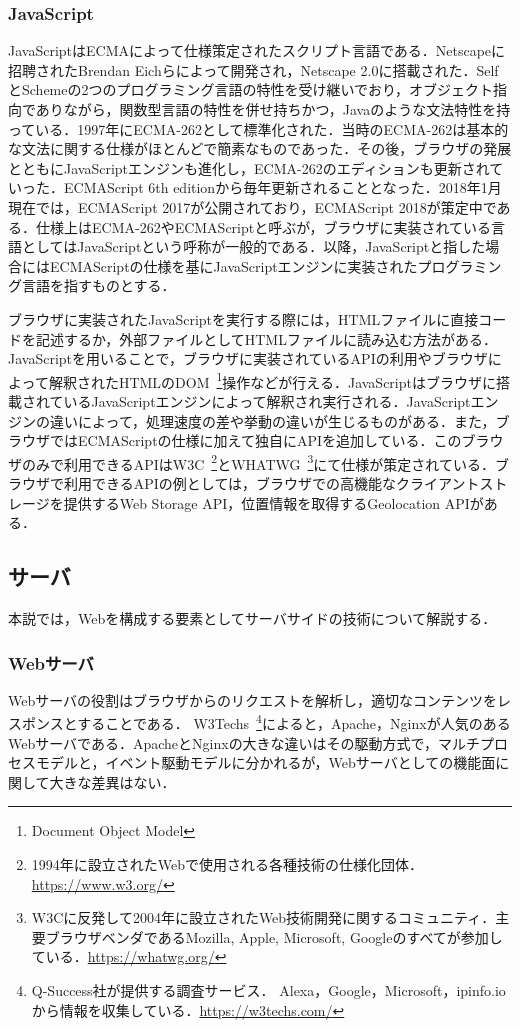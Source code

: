 \subsubsection{JavaScript}
JavaScriptはECMAによって仕様策定されたスクリプト言語である．Netscapeに招聘されたBrendan Eichらによって開発され，Netscape 2.0に搭載された．SelfとSchemeの2つのプログラミング言語の特性を受け継いでおり，オブジェクト指向でありながら，関数型言語の特性を併せ持ちかつ，Javaのような文法特性を持っている．1997年にECMA-262として標準化された．当時のECMA-262は基本的な文法に関する仕様がほとんどで簡素なものであった．その後，ブラウザの発展とともにJavaScriptエンジンも進化し，ECMA-262のエディションも更新されていった．ECMAScript 6th editionから毎年更新されることとなった．2018年1月現在では，ECMAScript 2017が公開されており，ECMAScript 2018が策定中である．仕様上はECMA-262やECMAScriptと呼ぶが，ブラウザに実装されている言語としてはJavaScriptという呼称が一般的である．以降，JavaScriptと指した場合にはECMAScriptの仕様を基にJavaScriptエンジンに実装されたプログラミング言語を指すものとする．

ブラウザに実装されたJavaScriptを実行する際には，HTMLファイルに直接コードを記述するか，外部ファイルとしてHTMLファイルに読み込む方法がある．JavaScriptを用いることで，ブラウザに実装されているAPIの利用やブラウザによって解釈されたHTMLのDOM~\footnote{Document Object Model}操作などが行える．JavaScriptはブラウザに搭載されているJavaScriptエンジンによって解釈され実行される．JavaScriptエンジンの違いによって，処理速度の差や挙動の違いが生じるものがある．また，ブラウザではECMAScriptの仕様に加えて独自にAPIを追加している．このブラウザのみで利用できるAPIはW3C~\footnote{1994年に設立されたWebで使用される各種技術の仕様化団体．\url{https://www.w3.org/}}とWHATWG~\footnote{W3Cに反発して2004年に設立されたWeb技術開発に関するコミュニティ．主要ブラウザベンダであるMozilla, Apple, Microsoft, Googleのすべてが参加している．\url{https://whatwg.org/}}にて仕様が策定されている．ブラウザで利用できるAPIの例としては，ブラウザでの高機能なクライアントストレージを提供するWeb Storage API，位置情報を取得するGeolocation APIがある．
\subsection{サーバ}
本説では，Webを構成する要素としてサーバサイドの技術について解説する．
\subsubsection{Webサーバ}
Webサーバの役割はブラウザからのリクエストを解析し，適切なコンテンツをレスポンスとすることである．
W3Techs~\footnote{Q-Success社が提供する調査サービス． Alexa，Google，Microsoft，ipinfo.ioから情報を収集している．\url{https://w3techs.com/}}によると，Apache，Nginxが人気のあるWebサーバである．ApacheとNginxの大きな違いはその駆動方式で，マルチプロセスモデルと，イベント駆動モデルに分かれるが，Webサーバとしての機能面に関して大きな差異はない．

